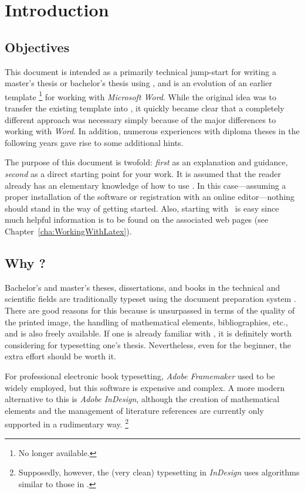 \chapter{Introduction}
\label{cha:Introduction}


\section{Objectives}

This document is intended as a primarily technical jump-start for writing a
master's thesis or bachelor's thesis using \latex, and is an evolution of an
earlier template%
\footnote{No longer available.}
for working with \emph{Microsoft Word}. While the original idea was to transfer
the existing template into \latex, it quickly became clear that a completely
different approach was necessary simply because of the major differences to
working with \emph{Word}. In addition, numerous experiences with diploma theses
in the following years gave rise to some additional hints.

The purpose of this document is twofold: \emph{first} as an explanation and
guidance, \emph{second} as a direct starting point for your work. It is assumed
that the reader already has an elementary knowledge of how to use \latex. In
this case---assuming a proper installation of the software or registration with
an \latex online editor---nothing should stand in the way of getting started.
Also, starting with \latex\ is easy since much helpful information is to be
found on the associated web pages (see Chapter~\ref{cha:WorkingWithLatex}).


\section{Why {\latex}?}

Bachelor's and master's theses, dissertations, and books in the technical and
scientific fields are traditionally typeset using the document preparation
system \latex \cite{Lamport1994, Lamport1995}. There are good reasons for this
because \latex is unsurpassed in terms of the quality of the printed image, the
handling of mathematical elements, bibliographies, etc., and is also freely
available. If one is already familiar with \latex, it is definitely worth
considering for typesetting one's thesis. Nevertheless, even for the beginner,
the extra effort should be worth it.

For professional electronic book typesetting, \emph{Adobe Framemaker} used to be
widely employed, but this software is expensive and complex. A more modern
alternative to this is \emph{Adobe InDesign}, although the creation of
mathematical elements and the management of literature references are currently
only supported in a rudimentary way.%
\footnote{Supposedly, however, the (very clean) typesetting in \emph{InDesign}
uses algorithms similar to those in \latex.}

